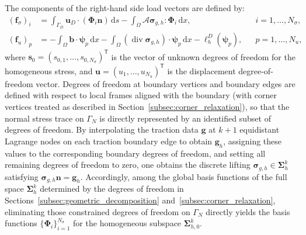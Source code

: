 The components of the right-hand side load vectors are defined by:
\begin{equation}
\label{eq:saddle_rhs}
\begin{aligned}
(\boldsymbol{f}_{\sigma})_i &= \int_{\Gamma_D} \boldsymbol{u}_D \cdot (\boldsymbol{\Phi}_i\boldsymbol{n})\,\mathrm{d}s - \int_\Omega \mathcal{A}\boldsymbol{\sigma}_{g,h} : \boldsymbol{\Phi}_i \,\mathrm{d}x, && i = 1, \dots, N_\sigma, \\
(\boldsymbol{f}_u)_p &= -\int_\Omega \boldsymbol{b} \cdot \boldsymbol{\psi}_p \,\mathrm{d}x - \int_\Omega (\operatorname{div}\boldsymbol{\sigma}_{g,h}) \cdot \boldsymbol{\psi}_p \,\mathrm{d}x - \ell_h^D(\boldsymbol{\psi}_p), && p = 1, \dots, N_u,
\end{aligned}
\end{equation}
where $\boldsymbol{s}_0 = (s_{0,1},\dots,s_{0,N_\sigma})^{\mathsf T}$ is the vector of unknown degrees of freedom for the homogeneous stress, and $\boldsymbol{u} = (u_1,\dots,u_{N_u})^{\mathsf T}$ is the displacement degree-of-freedom vector. Degrees of freedom at boundary vertices and boundary edges are defined with respect to local frames aligned with the boundary (with corner vertices treated as described in Section~\ref{subsec:corner_relaxation}), so that the normal stress trace on $\Gamma_N$ is directly represented by an identified subset of degrees of freedom. By interpolating the traction data $\boldsymbol{g}$ at $k+1$ equidistant Lagrange nodes on each traction boundary edge to obtain $\boldsymbol{g}_h$, assigning these values to the corresponding boundary degrees of freedom, and setting all remaining degrees of freedom to zero, one obtains the discrete lifting $\boldsymbol{\sigma}_{g,h} \in \boldsymbol{\Sigma}_h^k$ satisfying $\boldsymbol{\sigma}_{g,h}\boldsymbol{n} = \boldsymbol{g}_h$. Accordingly, among the global basis functions of the full space $\boldsymbol{\Sigma}_h^k$ determined by the degrees of freedom in Sections~\ref{subsec:geometric_decomposition} and~\ref{subsec:corner_relaxation}, eliminating those constrained degrees of freedom on $\Gamma_N$ directly yields the basis functions $\{\boldsymbol{\Phi}_i\}_{i=1}^{N_\sigma}$ for the homogeneous subspace $\boldsymbol{\Sigma}_{h,0}^k$.

